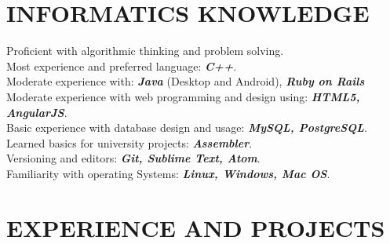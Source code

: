 \documentclass[margin, 10pt]{res} %
\begin{document}
\begin{resume}

\section{INFORMATICS KNOWLEDGE}
Proficient with algorithmic thinking and problem solving. \\
Most experience and preferred language: \textbf{\textit{C++}}. \\
Moderate experience with: \textbf{\textit{Java}} (Desktop and Android),
                          \textbf{\textit{Ruby on Rails}} \\
Moderate experience with web programming and design using: \textbf{\textit{HTML5, AngularJS}}. \\
Basic experience with database design and usage: \textbf{\textit{MySQL, PostgreSQL}}. \\
Learned basics for university projects: \textbf{\textit{Assembler}}. \\
Versioning and editors: \textbf{\textit{Git, Sublime Text, Atom}}.\\
Familiarity with operating Systems: \textbf{\textit{Linux, Windows, Mac OS}}.



\section{EXPERIENCE AND PROJECTS}


\end{resume}
\end{document}

